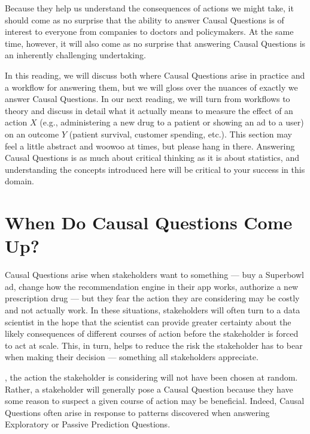 \documentclass[letterpaper,10pt,english]{jupyterBook}
\begin{document}
\sphinxAtStartPar
Because they help us understand the consequences of actions we might take, it should come as no surprise that the ability to answer Causal Questions is of  interest to everyone from companies to doctors and policymakers. At the same time, however, it will also come as no surprise that answering Causal Questions is an inherently challenging undertaking.

\sphinxAtStartPar
In this reading, we will discuss both where Causal Questions arise in practice and a workflow for answering them, but we will gloss over the nuances of  exactly we answer Causal Questions. In our next reading, we will turn from workflows to theory and discuss in detail what it actually means to measure the effect of an action \(X\) (e.g., administering a new drug to a patient or showing an ad to a user) on an outcome \(Y\) (patient survival, customer spending, etc.). This section may feel a little abstract and woo\sphinxhyphen{}woo at times, but please hang in there. Answering Causal Questions is as much about critical thinking as it is about statistics, and understanding the concepts introduced here will be critical to your success in this domain.


\section{When Do Causal Questions Come Up?}
\label{\detokenize{30_questions/35_using_causal_questions:when-do-causal-questions-come-up}}
\sphinxAtStartPar
Causal Questions arise when stakeholders want to  something — buy a Superbowl ad, change how the recommendation engine in their app works, authorize a new prescription drug — but they fear the action they are considering may be costly and not actually work. In these situations, stakeholders will often turn to a data scientist in the hope that the scientist can provide greater certainty about the likely consequences of different courses of action before the stakeholder is forced to act at scale. This, in turn, helps to reduce the risk the stakeholder has to bear when making their decision — something all stakeholders appreciate.

\sphinxAtStartPar
{}, the action the stakeholder is considering will not have been chosen at random. Rather, a stakeholder will generally pose a Causal Question because they have some reason to suspect a given course of action may be beneficial. Indeed, Causal Questions often arise in response to patterns discovered when answering Exploratory or Passive Prediction Questions.
\end{document}
